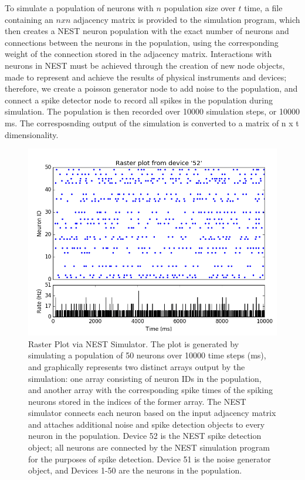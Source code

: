 \documentclass[11pt]{article}
\begin{document}
To simulate a population of neurons with $n$ population size over $t$ time, a file containing an $n x n$ adjacency matrix is provided to the simulation program, which then creates a NEST neuron population with the exact number of neurons and connections between the neurons in the population, using the corresponding weight of the connection stored in the adjacency matrix. Interactions with neurons in NEST must be achieved through the creation of new node objects, made to represent and achieve the results of physical instruments and devices; therefore, we create a poisson generator node to add noise to the population, and connect a spike detector node to record all spikes in the population during simulation. The population is then recorded over 10000 simulation steps, or 10000 ms. The corresposnding output of the simulation is converted to a matrix of n x t dimensionality.\par
\begin{figure}[H]
\centering
	\includegraphics[scale=0.5]{./Figures/figure_1.png} 
	\caption{Raster Plot via NEST Simulator. The plot is generated by simulating a population of 50 neurons over 10000 time steps (ms), and graphically represents two distinct arrays output by the simulation: one array consisting of neuron IDs in the population, and another array with the corresponding spike times of the spiking neurons stored in the indices of the former array. The NEST simulator connects each neuron based on the input adjacency matrix and attaches additional noise and spike detection objects to every neuron in the population. Device 52 is the NEST spike detection object; all neurons are connected by the NEST simulation program for the purposes of spike detection. Device 51 is the noise generator object, and Devices 1-50 are the neurons in the population. }
\end{figure}
\end{document}
